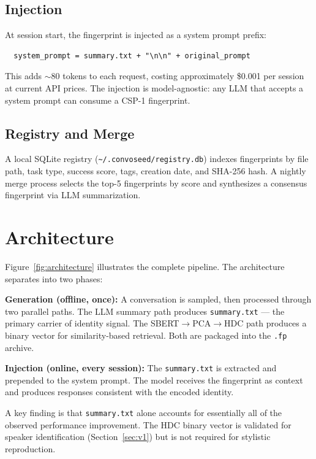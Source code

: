 \documentclass[11pt,a4paper]{article}
\begin{document}
\subsection{Injection}

At session start, the fingerprint is injected as a system prompt prefix:

\begin{verbatim}
  system_prompt = summary.txt + "\n\n" + original_prompt
\end{verbatim}

This adds $\sim$80 tokens to each request, costing approximately \$0.001 per session at current API prices. The injection is model-agnostic: any LLM that accepts a system prompt can consume a CSP-1 fingerprint.

\subsection{Registry and Merge}

A local SQLite registry (\texttt{\textasciitilde/.convoseed/registry.db}) indexes fingerprints by file path, task type, success score, tags, creation date, and SHA-256 hash. A nightly merge process selects the top-5 fingerprints by score and synthesizes a consensus fingerprint via LLM summarization.

\section{Architecture}

Figure~\ref{fig:architecture} illustrates the complete pipeline. The architecture separates into two phases:

\textbf{Generation (offline, once):} A conversation is sampled, then processed through two parallel paths. The LLM summary path produces \texttt{summary.txt} --- the primary carrier of identity signal. The SBERT$\to$PCA$\to$HDC path produces a binary vector for similarity-based retrieval. Both are packaged into the \texttt{.fp} archive.

\textbf{Injection (online, every session):} The \texttt{summary.txt} is extracted and prepended to the system prompt. The model receives the fingerprint as context and produces responses consistent with the encoded identity.

A key finding is that \texttt{summary.txt} alone accounts for essentially all of the observed performance improvement. The HDC binary vector is validated for speaker identification (Section~\ref{sec:v1}) but is not required for stylistic reproduction.
\end{document}
